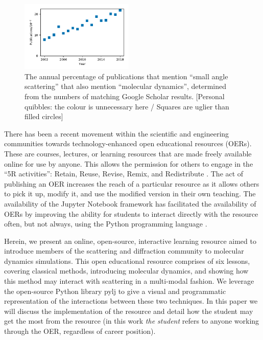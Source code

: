 \documentclass[amsmath,amssymb,twocolumn,superscriptaddress]{revtex4-1}
\begin{document}
%
\begin{figure}
\label{fig:growth}
\includegraphics[width=0.48\textwidth]{figures/chem_data_py.pdf}
\caption{The annual percentage of publications that mention ``small angle scattering'' that also mention ``molecular dynamics'', determined from the numbers of matching Google Scholar results. [Personal quibbles: the colour is unnecessary here / Squares are uglier than filled circles]}
\end{figure}
%

There has been a recent movement within the scientific and engineering communities towards technology-enhanced open educational resources (OERs).
These are courses, lectures, or learning resources that are made freely available online for use by anyone.
This allows the permission for others to engage in the ``5R activities'': Retain, Reuse, Revise, Remix, and Redistribute \cite{wiley_open_2018}.
The act of publishing an OER increases the reach of a particular resource as it allows others to pick it up, modify it, and use the modified version in their own teaching.
The availability of the Jupyter Notebook framework \cite{kluyver_jupyter_2016} has facilitated the availability of OERs by improving the ability for students to interact directly with the resource often, but not always, using the Python programming language \cite{barba_cybertraining_2017}.

Herein, we present an online, open-source, interactive learning resource aimed to introduce members of the scattering and diffraction community to molecular dynamics simulations.
This open educational resource comprises of six lessons, covering classical methods, introducing molecular dynamics, and showing how this method may interact with scattering in a multi-modal fashion.
We leverage the open-source Python library pylj \cite{mccluskey_pylj_2018} to give a visual and programmatic representation of the interactions between these two techniques.
In this paper we will discuss the implementation of the resource and detail how the student may get the most from the resource (in this work \emph{the student} refers to anyone working through the OER, regardless of career position).
\end{document}
